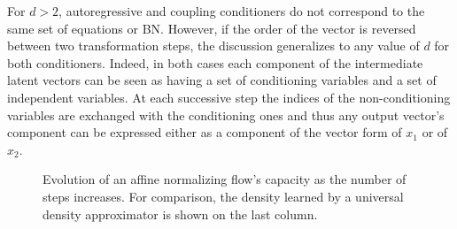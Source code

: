 For $d > 2$, autoregressive and coupling conditioners do not correspond to the same set of equations or BN. However, if the order of the vector is reversed between two transformation steps, the discussion generalizes to any value of $d$ for both conditioners. Indeed, in both cases each component of the intermediate latent vectors can be seen as having a set of conditioning variables and a set of independent variables. At each successive step the indices of the non-conditioning variables are exchanged with the conditioning ones and thus any output vector's component can be expressed either as a component of the vector form of $x_1$ or of $x_2$.

\begin{figure}
    \def\layersep{2.5cm}
    \centering
    \caption{Evolution of an affine normalizing flow's capacity as the number of steps increases. For comparison, the density learned by a universal density approximator is shown on the last column.}
    \label{fig:BN-steps}
\end{figure}
